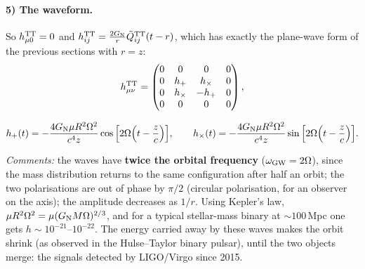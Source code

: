 \paragraph{5) The waveform.} So $h^{\rm TT}_{\mu0}=0$ and $h^{\rm TT}_{ij}=\frac{2G_{\mathrm N}}{r}\ddot Q^{\rm TT}_{ij}(t-r)$, which has exactly the plane-wave form of the previous sections with $r=z$:
\begin{equation}
  h^{\rm TT}_{\mu\nu}=\begin{pmatrix}0&0&0&0\\0&h_+&h_\times&0\\0&h_\times&-h_+&0\\0&0&0&0\end{pmatrix},
\end{equation}
\begin{keyresult}
\begin{equation}
  h_+(t)=-\frac{4G_{\mathrm N}\mu R^2\Omega^2}{c^4z}\cos\Big[2\Omega\Big(t-\frac zc\Big)\Big],\qquad
  h_\times(t)=-\frac{4G_{\mathrm N}\mu R^2\Omega^2}{c^4z}\sin\Big[2\Omega\Big(t-\frac zc\Big)\Big].
\end{equation}
\end{keyresult}
\textit{Comments:} the waves have \textbf{twice the orbital frequency} ($\omega_{\rm GW}=2\Omega$), since the mass distribution returns to the same configuration after half an orbit; the two polarisations are out of phase by $\pi/2$ (circular polarisation, for an observer on the axis); the amplitude decreases as $1/r$. Using Kepler's law, $\mu R^2\Omega^2=\mu(G_{\mathrm N} M\Omega)^{2/3}$, and for a typical stellar-mass binary at $\sim100$\,Mpc one gets $h\sim10^{-21}$--$10^{-22}$. The energy carried away by these waves makes the orbit shrink (as observed in the Hulse--Taylor binary pulsar), until the two objects merge: the signals detected by LIGO/Virgo since 2015.
